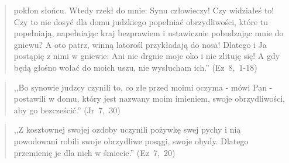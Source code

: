 \documentclass[10pt,a4paper,oneside]{article}
\begin{document}
\begin{quote}
pokłon słońcu. Wtedy rzekł do mnie: Synu człowieczy! Czy widziałeś to! Czy to nie dosyć dla domu judzkiego popełniać obrzydliwości, które tu popełniają, napełniając kraj bezprawiem i ustawicznie pobudzając mnie do gniewu? A oto patrz, winną latorośl przykładają do nosa! Dlatego i Ja postąpię z nimi w gniewie: Ani nie drgnie moje oko i nie zlituję się! A gdy będą głośno wołać do moich uszu, nie wysłucham ich.'' (Ez~8,~1-18)
\end{quote}
\begin{quote}
,,Bo synowie judzcy czynili to, co złe przed moimi oczyma - mówi Pan - postawili w domu, który jest nazwany moim imieniem, swoje obrzydliwości, aby go bezcześcić.'' (Jr~7,~30)
\end{quote}
\begin{quote}
,,Z kosztownej swojej ozdoby uczynili pożywkę swej pychy i nią powodowani robili swoje obrzydliwe posągi, swoje ohydy. Dlatego przemienię je dla nich w śmiecie.'' (Ez~7,~20)
\end{quote}
\end{document}
